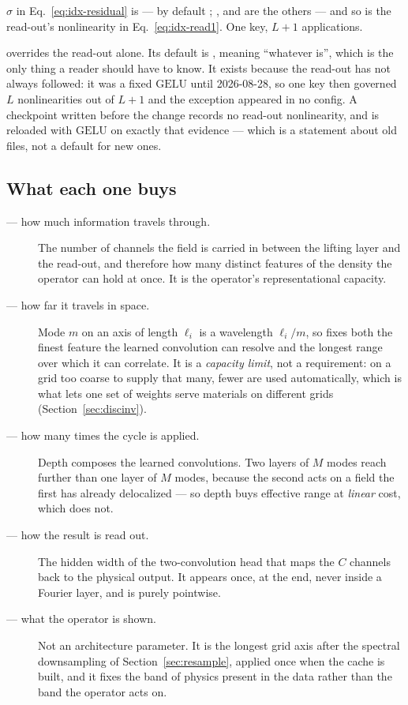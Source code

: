 \begin{pnote}
$\sigma$ in Eq.~\eqref{eq:idx-residual} is  --- by
default ; ,  and  are the others --- and so is the read-out's nonlinearity in
Eq.~\eqref{eq:idx-read1}. One key, $L+1$ applications.

 overrides the read-out alone. Its default is
, meaning ``whatever  is'', which is the only thing a
reader should have to know. It exists because the read-out has not always
followed: it was a fixed $\mathrm{GELU}$ until 2026-08-28, so one key then
governed $L$ nonlinearities out of $L+1$ and the exception appeared in no
config. A checkpoint written before the change records no read-out
nonlinearity, and is reloaded with $\mathrm{GELU}$ on exactly that evidence ---
which is a statement about old files, not a default for new ones.
\end{pnote}

\subsection{What each one buys}

\begin{description}
  \item[ --- how much information travels through.] The number of
    channels the field is carried in between the lifting layer and the
    read-out, and therefore how many distinct features of the density the
    operator can hold at once. It is the operator's representational capacity.
  \item[ --- how far it travels in space.] Mode $m$ on an axis of
    length $\ell_i$ is a wavelength $\ell_i/m$, so  fixes both the finest
    feature the learned convolution can resolve and the longest range over
    which it can correlate. It is a \emph{capacity limit}, not a requirement:
    on a grid too coarse to supply that many, fewer are used automatically,
    which is what lets one set of weights serve materials on different grids
    (Section~\ref{sec:discinv}).
  \item[ --- how many times the cycle is applied.] Depth
    composes the learned convolutions. Two layers of $M$ modes reach further
    than one layer of $M$ modes, because the second acts on a field the first
    has already delocalized --- so depth buys effective range at \emph{linear}
    cost, which  does not.
  \item[ --- how the result is read out.] The hidden
    width of the two-convolution head that maps the $C$ channels back to
    the physical output. It appears once, at the end, never inside a Fourier
    layer, and is purely pointwise.
  \item[ --- what the operator is shown.] Not an architecture
    parameter. It is the longest grid axis after the spectral downsampling of
    Section~\ref{sec:resample}, applied once when the cache is built, and it
    fixes the band of physics present in the data rather than the band the
    operator acts on.
\end{description}

